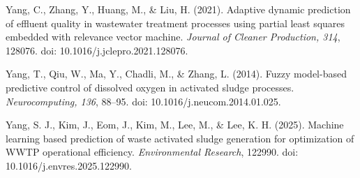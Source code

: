 \documentclass[a4paper,fleqn]{cas-sc}
\begin{document}
\noindent Yang, C., Zhang, Y., Huang, M., \& Liu, H. (2021). Adaptive dynamic prediction of effluent quality in wastewater treatment processes using partial least squares embedded with relevance vector machine. \textit{Journal of Cleaner Production, 314}, 128076. doi: 10.1016/j.jclepro.2021.128076.

\noindent Yang, T., Qiu, W., Ma, Y., Chadli, M., \& Zhang, L. (2014). Fuzzy model-based predictive control of dissolved oxygen in activated sludge processes. \textit{Neurocomputing, 136}, 88--95. doi: 10.1016/j.neucom.2014.01.025.

\noindent Yang, S. J., Kim, J., Eom, J., Kim, M., Lee, M., \& Lee, K. H. (2025). Machine learning based prediction of waste activated sludge generation for optimization of WWTP operational efficiency. \textit{Environmental Research}, 122990. doi: 10.1016/j.envres.2025.122990.
\end{document}
